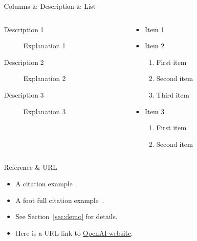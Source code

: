 \documentclass[compress,aspectratio=43]{beamer}
\begin{document}
\begin{frame}{Columns \& Description \& List}

    \begin{columns}

        \begin{column}{0.49\textwidth}
            \begin{description}
                \item[Description 1] Explanation 1
                \item[Description 2] Explanation 2
                \item[Description 3] Explanation 3
            \end{description}
        \end{column}

        \hfill

        \begin{column}{0.49\textwidth}
            \begin{itemize}
                \item Item 1
                \item Item 2
                      \begin{enumerate}
                          \item First item
                          \item Second item
                          \item Third item
                      \end{enumerate}
                \item Item 3
                      \begin{enumerate}
                          \item First item
                          \item Second item
                      \end{enumerate}
            \end{itemize}
        \end{column}
    \end{columns}

\end{frame}

\begin{frame}{Reference \& URL}
    \begin{itemize}
        \item A citation example~\cite{kochDynamicalLowRank2007}.

        \item A foot full citation example~.

        \item See Section~\ref{sec:demo} for details.

        \item Here is a URL link to \href{https://www.openai.com}{OpenAI website}.
    \end{itemize}
\end{frame}
\end{document}
